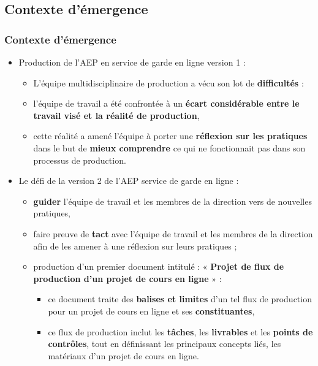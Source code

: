                \subsection{Contexte d'émergence} 
		\begin{frame}[allowframebreaks]
			\frametitle{Contexte d'émergence}
			\begin{itemize}
				\item Production de l'AEP en service de garde en ligne version 1 :
                                  \begin{itemize}
                                    \item L’équipe multidisciplinaire de production a vécu son lot de \textbf{difficultés} :
                                    \item l’équipe de travail a été confrontée à un \textbf{écart considérable entre le travail visé et la réalité de production},
                                    \item cette réalité a amené l’équipe à porter une \textbf{réflexion sur les pratiques} dans le but de \textbf{mieux comprendre} ce qui ne fonctionnait pas dans son processus de production.
                                  \end{itemize}
                                \framebreak
                                \item Le défi de la version 2 de l'AEP service de garde en ligne : 
                                  \begin{itemize}
                                  \item \textbf{guider} l’équipe de travail et les membres de la direction vers de nouvelles pratiques,
                                  \item faire preuve de \textbf{tact} avec l’équipe de travail et les membres de la direction afin de les amener à une réflexion sur leurs pratiques ; 
                                  \item production d'un premier document intitulé : « \textbf{Projet de flux de production d’un projet de cours en ligne} » :
                                    \begin{itemize}
                                      \item ce document traite des \textbf{balises et limites} d’un tel flux de production pour un projet de cours en ligne et ses \textbf{constituantes},
                                      \item ce flux de production inclut les\textbf{ tâches}, les \textbf{livrables} et les \textbf{points de contrôles}, tout en définissant les principaux concepts liés, les matériaux d’un projet de cours en ligne.
                                         
                                    \end{itemize} 
                                  \end{itemize}                                             
                                \end{itemize} 
                        \end{frame}

